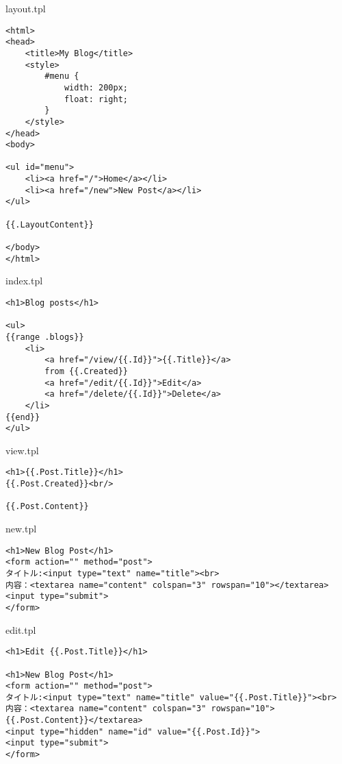 layout.tpl

\begin{lstlisting}[numbers=none]
<html>
<head>
    <title>My Blog</title>
    <style>
        #menu {
            width: 200px;
            float: right;
        }
    </style>
</head>
<body>

<ul id="menu">
    <li><a href="/">Home</a></li>
    <li><a href="/new">New Post</a></li>
</ul>

{{.LayoutContent}}

</body>
</html>
\end{lstlisting}

index.tpl

\begin{lstlisting}[numbers=none]
<h1>Blog posts</h1>

<ul>
{{range .blogs}}
    <li>
        <a href="/view/{{.Id}}">{{.Title}}</a>
        from {{.Created}}
        <a href="/edit/{{.Id}}">Edit</a>
        <a href="/delete/{{.Id}}">Delete</a>
    </li>
{{end}}
</ul>
\end{lstlisting}

view.tpl

\begin{lstlisting}[numbers=none]
<h1>{{.Post.Title}}</h1>
{{.Post.Created}}<br/>

{{.Post.Content}}                
\end{lstlisting}

new.tpl

\begin{lstlisting}[numbers=none]
<h1>New Blog Post</h1>
<form action="" method="post">
タイトル:<input type="text" name="title"><br>
内容：<textarea name="content" colspan="3" rowspan="10"></textarea>
<input type="submit">
</form>
\end{lstlisting}

edit.tpl

\begin{lstlisting}[numbers=none]
<h1>Edit {{.Post.Title}}</h1>

<h1>New Blog Post</h1>
<form action="" method="post">
タイトル:<input type="text" name="title" value="{{.Post.Title}}"><br>
内容：<textarea name="content" colspan="3" rowspan="10">{{.Post.Content}}</textarea>
<input type="hidden" name="id" value="{{.Post.Id}}">
<input type="submit">
</form>
\end{lstlisting}

